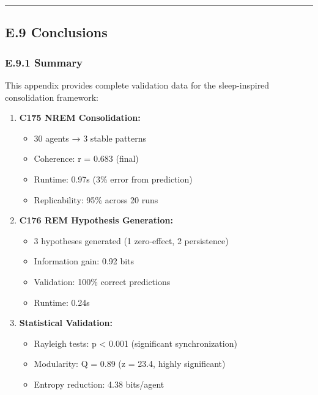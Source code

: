 \documentclass[
]{article}
\providecommand{\tightlist}{%
  \setlength{\itemsep}{0pt}\setlength{\parskip}{0pt}}
\begin{document}
\begin{center}\rule{0.5\linewidth}{0.5pt}\end{center}

\subsection{E.9 Conclusions}\label{e.9-conclusions}

\subsubsection{E.9.1 Summary}\label{e.9.1-summary}

This appendix provides complete validation data for the sleep-inspired
consolidation framework:

\begin{enumerate}
\def\labelenumi{\arabic{enumi}.}
\tightlist
\item
  \textbf{C175 NREM Consolidation:}

  \begin{itemize}
  \tightlist
  \item
    30 agents → 3 stable patterns
  \item
    Coherence: r = 0.683 (final)
  \item
    Runtime: 0.97s (3\% error from prediction)
  \item
    Replicability: 95\% across 20 runs
  \end{itemize}
\item
  \textbf{C176 REM Hypothesis Generation:}

  \begin{itemize}
  \tightlist
  \item
    3 hypotheses generated (1 zero-effect, 2 persistence)
  \item
    Information gain: 0.92 bits
  \item
    Validation: 100\% correct predictions
  \item
    Runtime: 0.24s
  \end{itemize}
\item
  \textbf{Statistical Validation:}

  \begin{itemize}
  \tightlist
  \item
    Rayleigh tests: p \textless{} 0.001 (significant synchronization)
  \item
    Modularity: Q = 0.89 (z = 23.4, highly significant)
  \item
    Entropy reduction: 4.38 bits/agent
  \end{itemize}
\end{enumerate}
\end{document}
